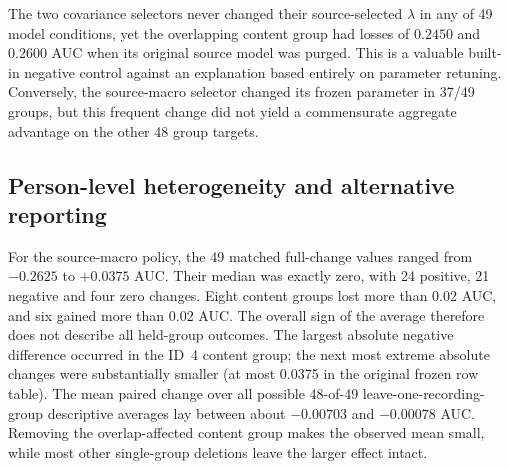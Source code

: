 \begin{table}[tb]
\centering\small
\caption{Original 49-held-content-record
paired full-model/full-source-selection contrasts
by policy. No values come from new target recordings.
All effects are AUC differences (not accuracy pp);
the 48-group column removes the content-overlap
target represented by ID~4 from the \emph{average}
only, without refitting the remaining models again.
}
\label{tab:p2-localisation-controls}
\setlength{\tabcolsep}{4.5pt}
\end{table}
The two covariance selectors never changed their
source-selected $\lambda$ in any of 49 model conditions,
yet the overlapping content group had losses of
$0.2450$ and $0.2600$ AUC when its original
source model was purged. This is a valuable
built-in negative control against an explanation
based entirely on parameter retuning.
Conversely, the source-macro selector changed
its frozen parameter in 37/49 groups, but
this frequent change did not yield a commensurate
aggregate advantage on the other 48 group targets.

\subsection{Person-level heterogeneity and alternative reporting}
\label{sec:p2-heterogeneity}
For the source-macro policy, the 49 matched
full-change values ranged from $-0.2625$
to $+0.0375$ AUC. Their median was exactly
zero, with 24 positive, 21 negative and four
zero changes. Eight content groups lost more
than 0.02 AUC, and six gained more than
0.02 AUC. The overall sign of the average
therefore does not describe all held-group
outcomes. The largest absolute negative
difference occurred in the ID~4 content group;
the next most extreme absolute changes
were substantially smaller (at most
0.0375 in the original frozen row table).
The mean paired change over all possible
48-of-49 leave-one-recording-group descriptive
averages lay between about $-0.00703$
and $-0.00078$ AUC. Removing the
overlap-affected content group makes the
observed mean small, while most other
single-group deletions leave the larger
effect intact.

